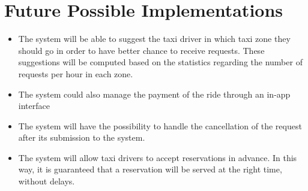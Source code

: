 \section{Future Possible Implementations}
\begin{itemize}
	\item The system will be able to suggest the taxi driver in which taxi zone they should go in order to have better chance to receive requests. These suggestions will be computed based on the statistics regarding the number of requests per hour in each zone.
	\item The system could also manage the payment of the ride through an in-app interface
	\item The system will have the possibility to handle the cancellation of the request after its submission to the system.
	\item The system will allow taxi drivers to accept reservations in advance. In this way, it is guaranteed that a reservation will be served at the right time, without delays.
\end{itemize}
